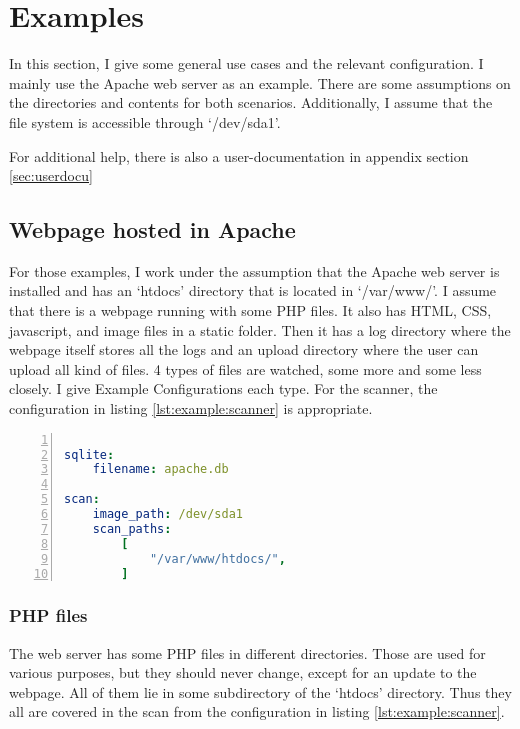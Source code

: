 \section{Examples}
\label{sec:Exaples}

In this section, I give some general use cases and the relevant configuration. I mainly use the Apache web server as an example. There are some assumptions on the directories and contents for both scenarios. Additionally, I assume that the file system is accessible through `/dev/sda1'.

For additional help, there is also a user-documentation in appendix section \ref{sec:userdocu}

\subsection{Webpage hosted in Apache}

For those examples, I work under the assumption that the Apache web server is installed and has an `htdocs' directory that is located in `/var/www/'. I assume that there is a webpage running with some PHP files. It also has HTML, CSS, javascript, and image files in a static folder. Then it has a log directory where the webpage itself stores all the logs and an upload directory where the user can upload all kind of files. 4 types of files are watched, some more and some less closely. I give Example Configurations each type. For the scanner, the configuration in listing \ref{lst:example:scanner} is appropriate.

\begin{lstlisting}[language=yaml, numbers=left, caption=Example Scanner Configuration, label=lst:example:scanner]

sqlite:
    filename: apache.db

scan:
    image_path: /dev/sda1
    scan_paths: 
        [
            "/var/www/htdocs/",
        ]

\end{lstlisting}

\subsubsection{PHP files}

The web server has some PHP files in different directories. Those are used for various purposes, but they should never change, except for an update to the webpage. All of them lie in some subdirectory of the `htdocs' directory. Thus they all are covered in the scan from the configuration in listing \ref{lst:example:scanner}. 


